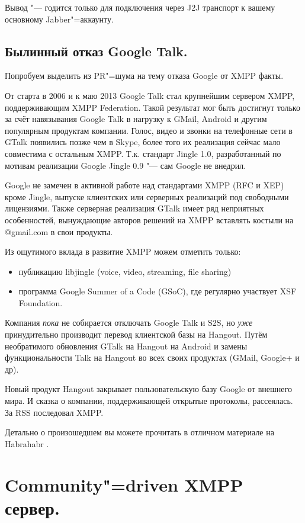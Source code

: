 \documentclass[10pt, a5paper]{article}
\begin{document}
Вывод "--- годится только для подключения через J2J транспорт к вашему основному Jabber"=аккаунту.

\subsection{Былинный отказ Google Talk.}

Попробуем выделить из PR"=шума на тему отказа Google от XMPP факты.

От старта в  2006 и к маю 2013 Google Talk стал крупнейшим сервером XMPP, поддерживающим XMPP Federation. Такой результат мог быть достигнут только за счёт навязывания Google Talk в нагрузку к GMail, Android и другим популярным продуктам компании.  Голос, видео и звонки на телефонные сети в GTalk появились позже чем в Skype, более того их реализация сейчас мало совместима с остальным XMPP. Т.к. стандарт Jingle 1.0, разработанный по мотивам реализации Google Jingle 0.9 "--- сам Google не внедрил.

Google не замечен в активной работе над стандартами XMPP (RFC и XEP) кроме Jingle, выпуске клиентских или серверных реализаций под свободными лицензиями. Также серверная реализация GTalk имеет ряд неприятных особенностей, вынуждающие авторов решений на XMPP вставлять костыли на @gmail.com в свои продукты.

Из ощутимого вклада в развитие XMPP можем отметить только:

\begin{itemize}
  \item публикацию libjingle (voice, video, streaming, file sharing)
  \item программа Google Summer of a Code (GSoC), где регулярно участвует XSF Foundation.
\end{itemize}

Компания \emph{пока} не собирается отключать Google Talk и S2S, но \emph{уже} принудительно производит перевод клиентской базы на Hangout. Путём необратимого обновления GTalk на Hangout на Android и замены функциональности Talk на Hangout во всех своих продуктах (GMail, Google+ и др).

Новый продукт Hangout закрывает пользовательскую базу Google от внешнего мира. И сказка о компании, поддерживающей открытые протоколы, рассеялась. За RSS последовал XMPP.

Детально о произошедшем вы можете прочитать в отличном материале на Habrahabr \footnotemark[3].

\section{Community"=driven XMPP сервер.}
\end{document}
